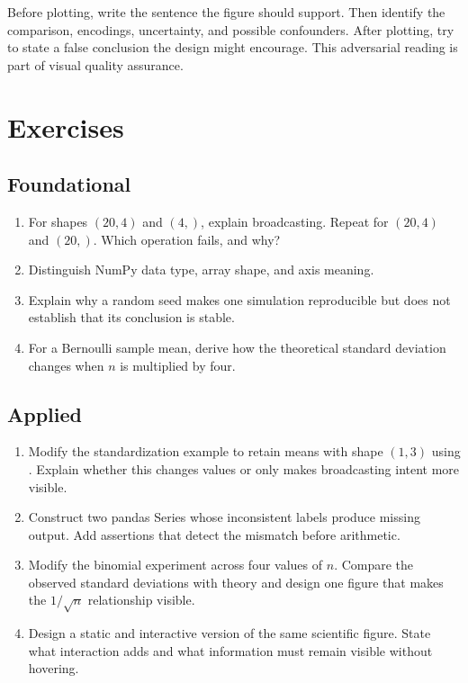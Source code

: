 Before plotting, write the sentence the figure should support. Then identify
the comparison, encodings, uncertainty, and possible confounders. After
plotting, try to state a false conclusion the design might encourage. This
adversarial reading is part of visual quality assurance.


\section{Exercises}

\subsection*{Foundational}
\begin{enumerate}
  \item For shapes $(20,4)$ and $(4,)$, explain broadcasting. Repeat for
  $(20,4)$ and $(20,)$. Which operation fails, and why?
  \item Distinguish NumPy data type, array shape, and axis meaning.
  \item Explain why a random seed makes one simulation reproducible but does not
  establish that its conclusion is stable.
  \item For a Bernoulli sample mean, derive how the theoretical standard
  deviation changes when $n$ is multiplied by four.
\end{enumerate}

\subsection*{Applied}
\begin{enumerate}
  \item Modify the standardization example to retain means with shape $(1,3)$
  using . Explain whether this changes values or only makes
  broadcasting intent more visible.
  \item Construct two pandas Series whose inconsistent labels produce missing
  output. Add assertions that detect the mismatch before arithmetic.
  \item Modify the binomial experiment across four values of $n$. Compare the
  observed standard deviations with theory and design one figure that makes the
  $1/\sqrt{n}$ relationship visible.
  \item Design a static and interactive version of the same scientific figure.
  State what interaction adds and what information must remain visible without
  hovering.
\end{enumerate}

